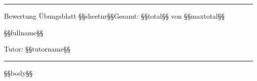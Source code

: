 \documentclass[12pt,a4paper]{article}
\begin{document}
\hrule
\smallskip

{\large Bewertung Übungsblatt §§sheetnr§§\hfill Gesamt: §§total§§ von §§maxtotal§§}\smallskip

{\large §§fullname§§}\smallskip

{Tutor: §§tutorname§§}

\smallskip
\hrule
\vspace{0.2cm}

§§body§§
\end{document}
